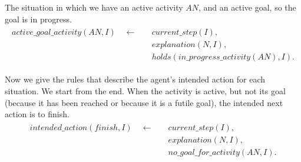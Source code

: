 \documentclass[11pt, oneside]{article}
\begin{document}
The situation in which we have an active activity $AN$, and an active goal, so the goal is in progress.
\begin{align}\begin{split}
active\_goal\_activity(AN,I)\quad \leftarrow \quad &current\_step(I),\\
&explanation(N,I),\\
&holds(in\_progress\_activity(AN),I).
\end{split}\end{align}


Now we give the rules that describe the agent's intended action for each situation. We start from the end. When the activity is active, but not its goal (because it has been reached or because it is a futile goal), the intended next action is to finish.
\begin{align}\begin{split}
intended\_action(finish,I)\quad \leftarrow \quad &current\_step(I),\\
&explanation(N,I),\\
&no\_goal\_for\_activity(AN,I).
\end{split}\end{align}
\end{document}
